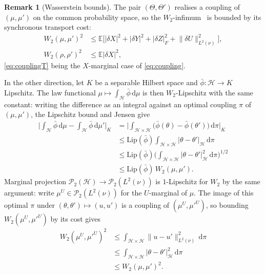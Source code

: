 \documentclass[preprint,12pt]{elsarticle}
\newcommand{\E}{\mathbb{E}}
\newcommand{\diff}{\mathrm{d}}
\newcommand{\Lnu}{L^2(\nu)}
\newcommand{\Lnorm}[1]{\lVert #1\rVert_{\Lnu}}
\numberwithin{equation}{section}
\theoremstyle{plain}
\theoremstyle{definition}
\theoremstyle{\PaperRemarkStyle}
\newtheorem{remark}[theorem]{Remark}
\begin{document}
\begin{remark}[Wasserstein bounds]\label{rem:wasserstein-bounds}
The pair $(\Theta,\Theta')$ realises a coupling of $(\mu,\mu')$ on the common probability
space, so the $W_2$-infimum~\cite[Definition~6.1]{Villani2009} is bounded by its synchronous transport
cost:
\begin{align}
W_2(\mu,\mu')^2&\le\E\big[|\delta X|^2+|\delta Y|^2+|\delta Z|_F^2+\Lnorm{\delta U}^2\big],
\label{eq:coupling}\\
W_2(\rho,\rho')^2&\le\E|\delta X|^2 ,\label{eq:couplingT}
\end{align}
\eqref{eq:couplingT} being the $X$-marginal case of \eqref{eq:coupling}.

In the other direction, let $K$ be a separable Hilbert space and $\bar\phi:\mathcal H\to K$
Lipschitz. The law functional $\mu\mapsto\int_{\mathcal H}\bar\phi\,\diff\mu$ is then
$W_2$-Lipschitz with the same constant: writing the difference as an integral against an
optimal coupling $\pi$ of $(\mu,\mu')$, the Lipschitz bound and Jensen give
\begin{align}
\Big|\int_{\mathcal H}\bar\phi\,\diff\mu-\int_{\mathcal H}\bar\phi\,\diff\mu'\Big|_K
&=\Big|\int_{\mathcal H\times\mathcal H}\big(\bar\phi(\theta)-\bar\phi(\theta')\big)\,\diff\pi\Big|_K\nonumber\\
&\le\mathrm{Lip}(\bar\phi)\int_{\mathcal H\times\mathcal H}|\theta-\theta'|_{\mathcal H}\,\diff\pi\nonumber\\
&\le\mathrm{Lip}(\bar\phi)\Big(\int_{\mathcal H\times\mathcal H}|\theta-\theta'|_{\mathcal H}^2\,\diff\pi\Big)^{1/2}\nonumber\\
&\le\mathrm{Lip}(\bar\phi)\,W_2(\mu,\mu') .\label{eq:lipfun}
\end{align}
Marginal projection $\mathcal P_2(\mathcal H)\to\mathcal P_2(\Lnu)$ is $1$-Lipschitz for $W_2$
by the same argument: write $\mu^U\in\mathcal P_2(\Lnu)$ for the $U$-marginal of $\mu$. The image
of this optimal $\pi$ under $(\theta,\theta')\mapsto(u,u')$ is a coupling of
$(\mu^U,\mu'^U)$, so bounding $W_2(\mu^U,\mu'^U)$ by its cost gives
\begin{align}
W_2(\mu^U,\mu'^U)^2
&\le\int_{\mathcal H\times\mathcal H}\Lnorm{u-u'}^2\,\diff\pi\nonumber\\
&\le\int_{\mathcal H\times\mathcal H}|\theta-\theta'|_{\mathcal H}^2\,\diff\pi\nonumber\\
&\le W_2(\mu,\mu')^2 .\label{eq:margproj}
\end{align}
\end{remark}
\end{document}
